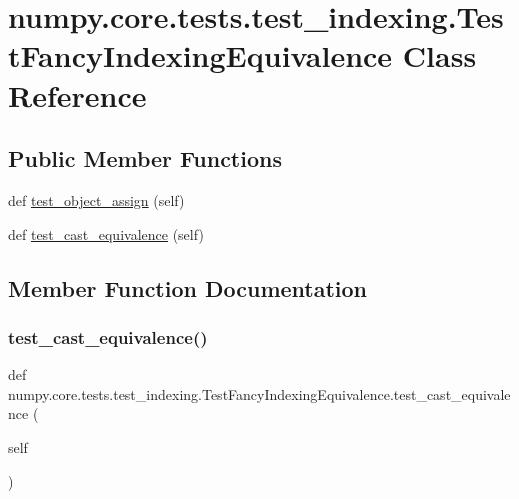 \hypertarget{classnumpy_1_1core_1_1tests_1_1test__indexing_1_1TestFancyIndexingEquivalence}{}\section{numpy.\+core.\+tests.\+test\+\_\+indexing.\+Test\+Fancy\+Indexing\+Equivalence Class Reference}
\label{classnumpy_1_1core_1_1tests_1_1test__indexing_1_1TestFancyIndexingEquivalence}
\subsection*{Public Member Functions}
\begin{DoxyCompactItemize}
\item 
def \hyperlink{classnumpy_1_1core_1_1tests_1_1test__indexing_1_1TestFancyIndexingEquivalence_a5f1060e6566a28103c317eb0266542eb}{test\+\_\+object\+\_\+assign} (self)
\item 
def \hyperlink{classnumpy_1_1core_1_1tests_1_1test__indexing_1_1TestFancyIndexingEquivalence_a709dd7a25a35d60999f108be5207d923}{test\+\_\+cast\+\_\+equivalence} (self)
\end{DoxyCompactItemize}


\subsection{Member Function Documentation}
\mbox{\label{classnumpy_1_1core_1_1tests_1_1test__indexing_1_1TestFancyIndexingEquivalence_a709dd7a25a35d60999f108be5207d923}} 
\subsubsection{\texorpdfstring{test\+\_\+cast\+\_\+equivalence()}{test\_cast\_equivalence()}}
{\footnotesize\ttfamily def numpy.\+core.\+tests.\+test\+\_\+indexing.\+Test\+Fancy\+Indexing\+Equivalence.\+test\+\_\+cast\+\_\+equivalence (\begin{DoxyParamCaption}\item[{}]{self }\end{DoxyParamCaption})}

